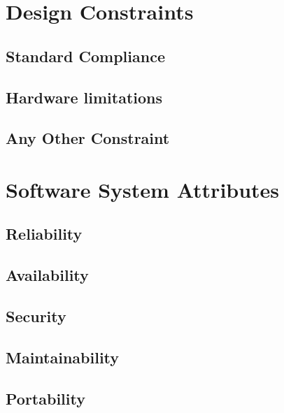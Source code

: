 \section{Design Constraints}

\subsection{Standard Compliance}
\subsection{Hardware limitations}
\subsection{Any Other Constraint}

\section{Software System Attributes}

\subsection{Reliability}
\subsection{Availability}
\subsection{Security}
\subsection{Maintainability}
\subsection{Portability}